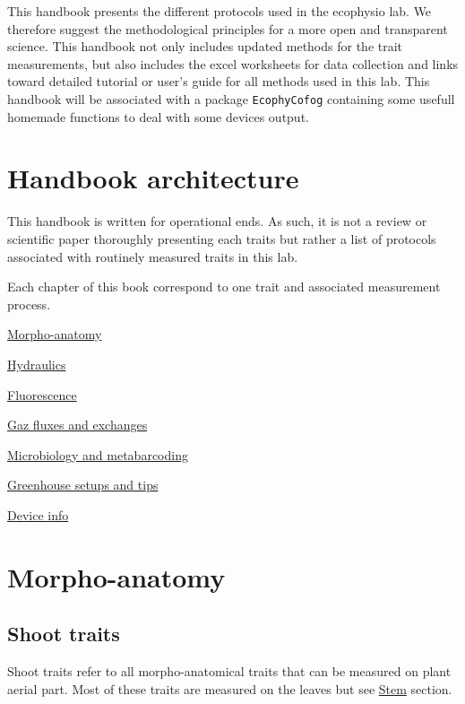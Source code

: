 \documentclass[
  12pt,
  american,
  a4paper,
  extrafontsizes,onecolumn,openright
  ]{memoir}
\begin{document}
This handbook presents the different protocols used in the ecophysio lab.
We therefore suggest the methodological principles for a more open and transparent science.
This handbook not only includes updated methods for the trait measurements, but also includes the excel worksheets for data collection and links toward detailed tutorial or user's guide for all methods used in this lab.
This handbook will be associated with a package \texttt{EcophyCofog} containing some usefull homemade functions to deal with some devices output.

\mainmatter

\hypertarget{handbook-architecture}{%
\chapter{Handbook architecture}\label{handbook-architecture}}

This handbook is written for operational ends. As such, it is not a review or scientific paper thoroughly presenting each traits but rather a list of protocols associated with routinely measured traits in this lab.

Each chapter of this book correspond to one trait and associated measurement process.

\protect\hyperlink{morpho-anatomy}{Morpho-anatomy}

\protect\hyperlink{hydraulics}{Hydraulics}

\protect\hyperlink{fluorescence}{Fluorescence}

\protect\hyperlink{gaz-fluxes-and-exchanges}{Gaz fluxes and exchanges}

\protect\hyperlink{microbiology-and-metabarcoding}{Microbiology and metabarcoding}

\protect\hyperlink{greenhouse-setups-and-tips}{Greenhouse setups and tips}

\protect\hyperlink{device-info}{Device info}

\hypertarget{morpho-anatomy}{%
\chapter{Morpho-anatomy}\label{morpho-anatomy}}

\hypertarget{shoot-traits}{%
\section{Shoot traits}\label{shoot-traits}}

Shoot traits refer to all morpho-anatomical traits that can be measured on plant aerial part.
Most of these traits are measured on the leaves but see \protect\hyperlink{stem}{Stem} section.
\end{document}

